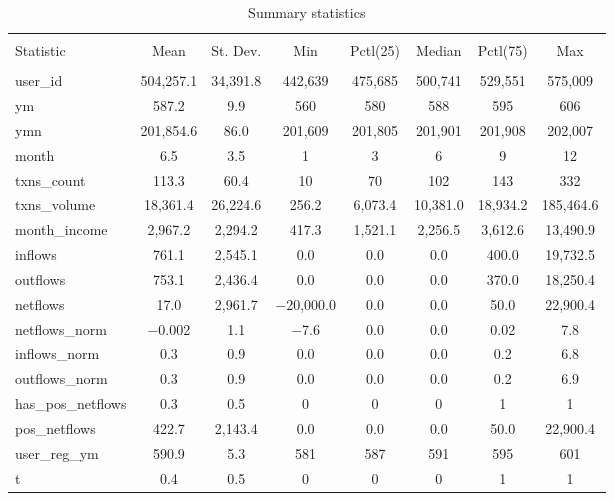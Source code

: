 
\begin{table}[H] \centering 
  \caption{Summary statistics} 
  \label{tab:sumstats} 
\footnotesize 
\begin{tabular}{@{\extracolsep{5pt}}lccccccc} 
\\[-1.8ex]\hline 
\hline \\[-1.8ex] 
Statistic & \multicolumn{1}{c}{Mean} & \multicolumn{1}{c}{St. Dev.} & \multicolumn{1}{c}{Min} & \multicolumn{1}{c}{Pctl(25)} & \multicolumn{1}{c}{Median} & \multicolumn{1}{c}{Pctl(75)} & \multicolumn{1}{c}{Max} \\ 
\hline \\[-1.8ex] 
user\_id & 504,257.1 & 34,391.8 & 442,639 & 475,685 & 500,741 & 529,551 & 575,009 \\ 
ym & 587.2 & 9.9 & 560 & 580 & 588 & 595 & 606 \\ 
ymn & 201,854.6 & 86.0 & 201,609 & 201,805 & 201,901 & 201,908 & 202,007 \\ 
month & 6.5 & 3.5 & 1 & 3 & 6 & 9 & 12 \\ 
txns\_count & 113.3 & 60.4 & 10 & 70 & 102 & 143 & 332 \\ 
txns\_volume & 18,361.4 & 26,224.6 & 256.2 & 6,073.4 & 10,381.0 & 18,934.2 & 185,464.6 \\ 
month\_income & 2,967.2 & 2,294.2 & 417.3 & 1,521.1 & 2,256.5 & 3,612.6 & 13,490.9 \\ 
inflows & 761.1 & 2,545.1 & 0.0 & 0.0 & 0.0 & 400.0 & 19,732.5 \\ 
outflows & 753.1 & 2,436.4 & 0.0 & 0.0 & 0.0 & 370.0 & 18,250.4 \\ 
netflows & 17.0 & 2,961.7 & $-$20,000.0 & 0.0 & 0.0 & 50.0 & 22,900.4 \\ 
netflows\_norm & $-$0.002 & 1.1 & $-$7.6 & 0.0 & 0.0 & 0.02 & 7.8 \\ 
inflows\_norm & 0.3 & 0.9 & 0.0 & 0.0 & 0.0 & 0.2 & 6.8 \\ 
outflows\_norm & 0.3 & 0.9 & 0.0 & 0.0 & 0.0 & 0.2 & 6.9 \\ 
has\_pos\_netflows & 0.3 & 0.5 & 0 & 0 & 0 & 1 & 1 \\ 
pos\_netflows & 422.7 & 2,143.4 & 0.0 & 0.0 & 0.0 & 50.0 & 22,900.4 \\ 
user\_reg\_ym & 590.9 & 5.3 & 581 & 587 & 591 & 595 & 601 \\ 
t & 0.4 & 0.5 & 0 & 0 & 0 & 1 & 1 \\ 

\end{tabular}
\end{table}
